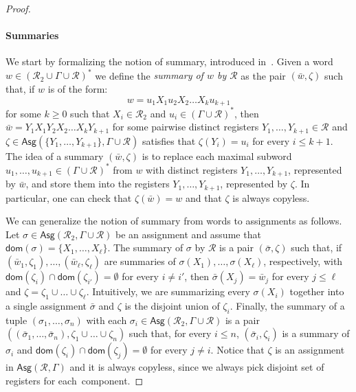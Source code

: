 \documentclass[
a4paper
]{article}
\theoremstyle{plain}
\theoremstyle{definition}
\theoremstyle{remark}
\newcommand{\dom}{\operatorname{dom}}
\newcommand{\Reg}{\mathcal{R}}
\newcommand{\Asg}{\operatorname{Asg}}
\renewcommand{\operatorname}[1]{\textsf{#1}}
\begin{document}
\begin{proof}
\paragraph{Summaries} We start by formalizing the notion of summary, introduced in~\cite{AlurC10}. Given a word $w \in (\Reg_2 \cup \Gamma \cup \Reg)^*$ we define the \emph{summary of $w$ by $\Reg$} as the pair $(\bar{w}, \zeta)$ such that, if $w$ is of the form:
\[
w = u_1 X_1 u_2 X_2 \ldots X_k u_{k+1}
\]
for some $k \geq 0$ such that $X_i \in \Reg_2$ and $u_i \in (\Gamma \cup \Reg)^*$, then $\bar{w} = Y_1 X_1 Y_2 X_2 \ldots X_k Y_{k+1}$ for some pairwise distinct registers $Y_1, \ldots, Y_{k+1} \in \Reg$ and $\zeta \in \Asg(\{Y_1, \ldots, Y_{k+1}\}, \Gamma \cup \Reg)$ satisfies that $\zeta(Y_i) = u_i$ for every $i \leq k+1$. The idea of a summary $(\bar{w}, \zeta)$ is to replace each maximal subword $u_1, \ldots, u_{k+1} \in (\Gamma \cup \Reg)^*$ from $w$ with distinct registers $Y_1, \ldots, Y_{k+1}$, represented by $\bar{w}$, and store them into the registers $Y_1, \ldots, Y_{k+1}$, represented by $\zeta$. In particular, one can check that $\zeta(\bar{w}) = w$ and that $\zeta$ is always copyless.

We can generalize the notion of summary from words to assignments as follows. Let $\sigma \in \Asg(\Reg_2, \Gamma \cup \Reg)$ be an assignment and assume that $\dom(\sigma) = \{X_1,\ldots, X_\ell\}$. 
The summary of $\sigma$ by $\Reg$ is a pair $(\bar{\sigma}, \zeta)$ such that, if $(\bar{w}_1, \zeta_1), \ldots, (\bar{w}_\ell, \zeta_\ell)$ are summaries of $\sigma(X_1), \ldots, \sigma(X_\ell)$, respectively, with $\dom(\zeta_i) \cap \dom(\zeta_{i'}) = \emptyset$ for every $i \neq i'$, then $\bar{\sigma}(X_j) = \bar{w}_j$ for every $j \leq \ell$ and $\zeta = \zeta_1 \cup \ldots \cup \zeta_{\ell}$. Intuitively, we are summarizing every $\sigma(X_i)$ together into a single assignment $\bar{\sigma}$ and $\zeta$ is the disjoint union of $\zeta_i$.
Finally, the summary of a tuple $(\sigma_1, \ldots, \sigma_n)$ with each $\sigma_i \in \Asg(\Reg_2, \Gamma \cup \Reg)$ is a pair $((\bar{\sigma}_1, \ldots, \bar{\sigma}_n), \zeta_1 \cup \ldots \cup \zeta_n)$ such that, for every $i \leq n$, $(\bar{\sigma}_i, \zeta_i)$ is a summary of $\sigma_i$ and $\dom(\zeta_{i}) \cap \dom(\zeta_{j}) = \emptyset$ for every $j \neq i$.  
Notice that $\zeta$ is an assignment in $\Asg(\Reg, \Gamma)$ and it is always copyless, since we always pick disjoint set of registers for each~component.


\end{proof}
\end{document}
